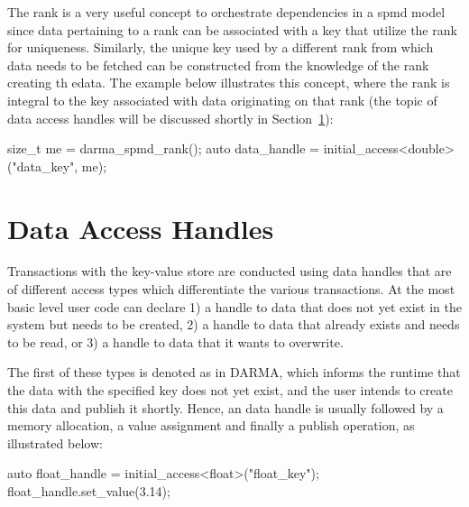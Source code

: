 The rank is a very useful concept to orchestrate dependencies in a \gls{spmd}
model since data pertaining to a rank can be associated with a key that utilize
the rank for uniqueness. Similarly, the unique key used by a different rank
from which data needs to be fetched can be constructed from the knowledge of
the rank creating th edata.  The example below illustrates this concept, where
the rank is integral to the key associated with data originating on that rank
(the topic of data access handles will be discussed shortly in Section~\ref{sec:handles}):
\begin{CppCode}
size_t me = darma_spmd_rank();
auto data_handle = initial_access<double>("data_key", me);
\end{CppCode}  

\section{Data Access Handles}
\label{sec:handles}



Transactions with the \gls{key-value store} are conducted using data handles that are of different access types which differentiate the 
various transactions. At the most basic level user code can declare 1) a handle to data that does not yet exist in the system
but needs to be created, 2) a handle to data that already exists and needs to
be read, or 3) a handle to data that it wants to overwrite. 

The first of these types is denoted as  in DARMA, which informs the runtime that the data with the 
specified key does not yet exist, and the user intends to create this data and publish it shortly. Hence, an 
data handle is usually followed by a memory allocation, a value assignment and finally a publish operation, as illustrated below: 
\begin{CppCode}
auto float_handle = initial_access<float>("float_key");
float_handle.set_value(3.14);
\end{CppCode}


